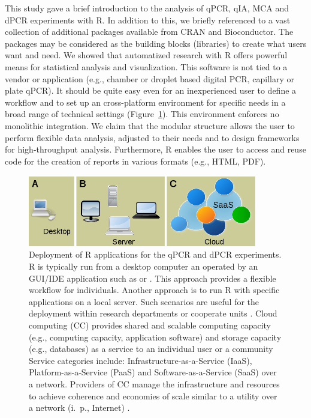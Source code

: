 This study gave a brief introduction to the analysis of qPCR, qIA, MCA and dPCR 
experiments with R. In addition to this, we briefly referenced to a vast 
collection of additional packages available from CRAN and Bioconductor. The 
packages may be considered as the building blocks (libraries) to create what 
users want and need. We showed that automatized research with R offers powerful 
means for statistical analysis and visualization. This software is not tied to a 
vendor or application (e.g., chamber or droplet based digital PCR, 
capillary or plate qPCR). It should be quite easy even for an inexperienced user 
to define a workflow and to set up an cross-platform environment for specific needs in a broad 
range of technical settings (Figure~\ref{figure:options}). This environment enforces no 
monolithic integration. We claim that the modular structure allows 
the user to perform flexible data analysis, adjusted to their needs and to 
design frameworks for high-throughput analysis. Furthermore, R enables the user 
to access and reuse code for the creation of reports in various formats (e.g., 
HTML, PDF).

\begin{figure}[htbp]
  \centering
  \includegraphics[clip=true, trim=0.05cm 0cm 0.06cm 0.05cm, width=10cm]{figures/options.png}
  \caption{Deployment of R applications for the qPCR and dPCR experiments. 
 R is typically run from a desktop computer an operated by an 
GUI/IDE application such as  or . This approach 
provides a flexible workflow for individuals.  Another approach is 
to run R with specific applications on a local server. Such scenarios are 
useful 
for the deployment within research departments or cooperate units 
\citep{R_web}. 
 Cloud computing (CC) provides shared and scalable computing 
capacity (e.g., computing capacity, application software) and storage capacity 
(e.g., databases) as a service to an individual user or a community Service 
categories include: Infrastructure-as-a-Service (IaaS), Platform-as-a-Service 
(PaaS) and Software-as-a-Service (SaaS) over a network. Providers of CC manage 
the infrastructure and resources to achieve coherence and economies of scale 
similar to a utility over a network (i.~p., Internet) \citep{R_cloud}.}
  \label{figure:options}
\end{figure} 

